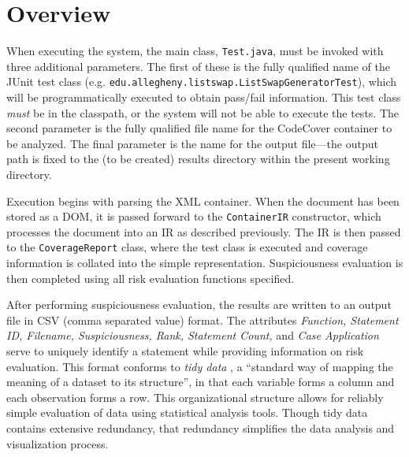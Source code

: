 \section{Overview} \label{sec:over}

When executing the system, the main class, \texttt{Test.java}, must be invoked with three additional
parameters.  The first of these is the fully qualified name of the JUnit test class (e.g. \texttt{edu.allegheny.listswap.ListSwapGeneratorTest}), which will be programmatically executed to
obtain pass/fail information.  This test class \emph{must} be in the classpath, or the system will
not be able to execute the tests.  The second parameter is the fully qualified file name for the 
CodeCover container to be analyzed.  The final parameter is the name for the output file---the 
output path is fixed to the (to be created) results directory within the present working directory.

Execution begins with parsing the XML container.  When the document has been stored as a DOM, it is
passed forward to the \texttt{ContainerIR} constructor, which processes the document into an IR as
described previously.  The IR is then passed to the \texttt{CoverageReport} class, where the 
test class is executed and coverage information is collated into the simple representation.
Suspiciousness evaluation is then completed using all risk evaluation functions specified.

After performing suspiciousness evaluation, the results are written to an output file in CSV (comma
separated value) format.  The attributes \textit{Function, Statement ID, Filename, Suspiciousness, Rank,
Statement Count,}
and \textit{Case Application} serve to uniquely identify a statement while providing information on risk evaluation.  
This format conforms to \textit{tidy data}  \cite{tidy}, a ``standard way of mapping the meaning of a 
dataset to its structure'', in that each variable forms a column and each observation forms a row.  
This organizational structure allows for reliably simple evaluation of data using statistical 
analysis tools.  Though tidy data contains extensive redundancy, that redundancy simplifies
the data analysis and visualization process.

